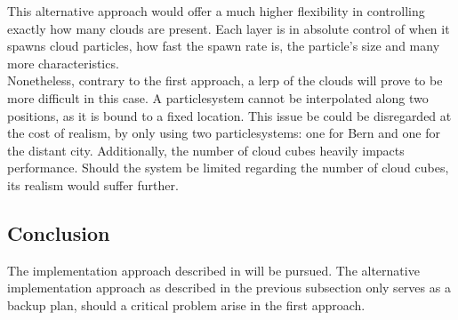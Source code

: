 \begin{figure}[H]
    \centering
    \label{img:tikz:altapproach}       
\end{figure}

\noindent
This alternative approach would offer a much higher flexibility in controlling exactly how many clouds are present.
Each layer is in absolute control of when it spawns cloud particles, how fast the spawn rate is, the particle's size and many more characteristics. 
\\
Nonetheless, contrary to the first approach, a \gls{lerp} of the clouds will prove to be more difficult in this case.
A \gls{particlesystem} cannot be interpolated along two positions, as it is bound to a fixed location.
This issue be could be disregarded at the cost of realism, by only using two \gls{particlesystem}s:
one for Bern and one for the distant city.
Additionally, the number of cloud cubes heavily impacts performance. Should the system be limited regarding the number of cloud cubes, its realism would suffer further.

\subsection{Conclusion}
The implementation approach described in  will be pursued.
The alternative implementation approach as described in the previous subsection only serves as a backup plan, should a critical problem arise in the first approach.